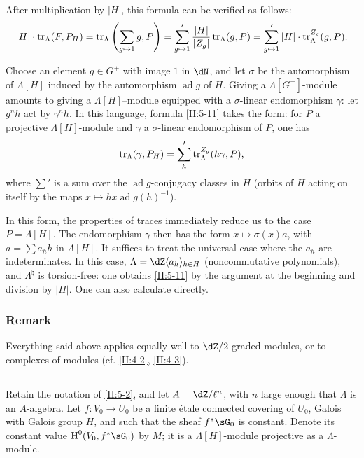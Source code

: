 After multiplication by $|H|$, this formula can be verified as follows:
\[
  |H|\cdot \operatorname{tr}_\Lambda(F,P_H)
    = \operatorname{tr}_\Lambda\left(\sum_{g\mapsto 1} g,P\right)
    = \sum_{g\mapsto 1}' \frac{|H|}{|Z_g|}\operatorname{tr}_\Lambda(g,P)
    = \sum_{g\mapsto 1}' |H|\cdot \operatorname{tr}_\Lambda^{Z_g}(g,P) \text{.}
\]

Choose an element $g\in G^+$ with image $1$ in $\dN$, and let $\sigma$ be
the automorphism of $\Lambda[H]$ induced by the automorphism
$\operatorname{ad} g$ of $H$. Giving a $\Lambda[G^+]$-module amounts to
giving a $\Lambda[H]$--module equipped with a $\sigma$-linear endomorphism
$\gamma$: let $g^n h$ act by $\gamma^n h$. In this language, formula
\ref{II:5-11} takes the form: for $P$ a projective $\Lambda[H]$-module and
$\gamma$ a $\sigma$-linear endomorphism of $P$, one has
\[
  \operatorname{tr}_\Lambda(\gamma,P_H) = \sum_h' \operatorname{tr}_\Lambda^{Z_g}(h\gamma,P)\text{,}
\]
where $\sum'$ is a sum over the $\operatorname{ad}g$-conjugacy classes in
$H$ (orbits of $H$ acting on itself by the maps
$x\mapsto h x \operatorname{ad} g(h)^{-1}$).

In this form, the properties of traces immediately reduce us to the case
$P=\Lambda[H]$. The endomorphism $\gamma$ then has the form
$x\mapsto \sigma(x) a$, with $a=\sum a_h h$ in $\Lambda[H]$. It suffices to
treat the universal case where the $a_h$ are indeterminates. In this case,
$\Lambda=\dZ\langle a_h\rangle_{h\in H}$ (noncommutative polynomials), and
$\Lambda^\natural$ is torsion-free: one obtains \ref{II:5-11} by the
argument at the beginning and division by $|H|$. One can also calculate
directly.






\subsubsection{Remark}\label{II:5-11-1}

Everything said above applies equally well to $\dZ/2$-graded modules, or to
complexes of modules (cf. \ref{II:4-2}, \ref{II:4-3}).






\subsection{}\label{II:5-12}

Retain the notation of \ref{II:5-2}, and let $A=\dZ/\ell^n$, with $n$ large
enough that $\Lambda$ is an $A$-algebra. Let $f:V_0\to U_0$ be a finite
\'etale connected covering of $U_0$, Galois with Galois group $H$, and such
that the sheaf $f^*\sG_0$ is constant. Denote its constant value
$\h^0(V_0,f^*\sG_0)$ by $M$; it is a $\Lambda[H]$-module projective as a
$\Lambda$-module.

